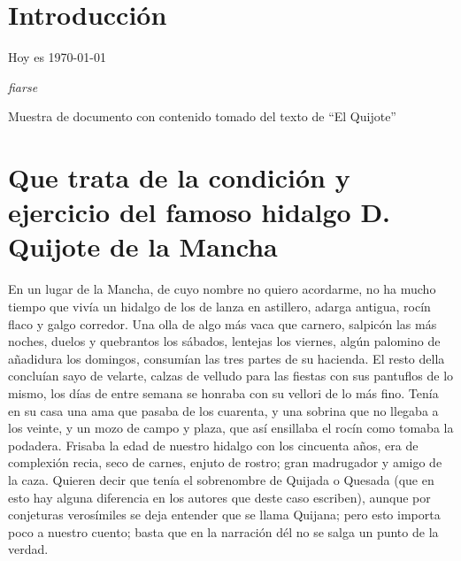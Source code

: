 \documentclass[12pt,
               twocolumn
              ]{article}
\begin{document}
\tableofcontents %

\section{Introducción}


\begin{flushleft}
Hoy es \today \newline

\textsl{fiarse}

\end{flushleft}


\begin{flushleft}
  Muestra de documento con contenido tomado del texto de ``El
  Quijote''
\end{flushleft}

\section{Que trata de la condición y ejercicio del famoso hidalgo
  D. Quijote de la Mancha}

En un lugar de la Mancha, de cuyo nombre no quiero acordarme, no ha
mucho tiempo que vivía un hidalgo de los de lanza en astillero, adarga
antigua, rocín flaco y galgo corredor. Una olla de algo más vaca que
carnero, salpicón las más noches, duelos y quebrantos los sábados,
lentejas los viernes, algún palomino de añadidura los domingos,
consumían las tres partes de su hacienda. El resto della concluían
sayo de velarte, calzas de velludo para las fiestas con sus pantuflos
de lo mismo, los días de entre semana se honraba con su vellori de lo
más fino. Tenía en su casa una ama que pasaba de los cuarenta, y una
sobrina que no llegaba a los veinte, y un mozo de campo y plaza, que
así ensillaba el rocín como tomaba la podadera. Frisaba la edad de
nuestro hidalgo con los cincuenta años, era de complexión recia, seco
de carnes, enjuto de rostro; gran madrugador y amigo de la
caza. Quieren decir que tenía el sobrenombre de Quijada o Quesada (que
en esto hay alguna diferencia en los autores que deste caso escriben),
aunque por conjeturas verosímiles se deja entender que se llama
Quijana; pero esto importa poco a nuestro cuento; basta que en la
narración dél no se salga un punto de la verdad.
\end{document}
